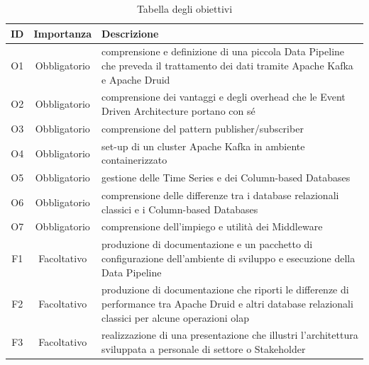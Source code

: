  \begin{table}[htbp]
    \centering
    \caption{Tabella degli obiettivi}    
    \label{tab:Tabella1}
    \begin{tabularx}{\textwidth}{|c|c|X|}
        \hline
        \textbf{ID} & \textbf{Importanza} & \textbf{Descrizione} \\\hline
        O1 & Obbligatorio & comprensione e definizione di una piccola \gls{Data Pipeline}{}  che  preveda il trattamento dei dati
        tramite Apache Kafka e Apache Druid \\\hline
        O2 & Obbligatorio & comprensione dei vantaggi e degli overhead  che le Event Driven Architecture portano con
        sé\\\hline
        O3 & Obbligatorio & comprensione del pattern publisher/subscriber \\\hline
        O4 & Obbligatorio & set-up di un cluster Apache Kafka in ambiente  containerizzato \\\hline
        O5 & Obbligatorio & gestione delle Time Series e dei Column-based Databases \\\hline
        O6 & Obbligatorio & comprensione delle differenze tra i database relazionali  classici e i Column-based Databases\\\hline
        O7 & Obbligatorio &comprensione dell’impiego e utilità dei \gls{Middleware}{} \\\hline
        F1 & Facoltativo & produzione di documentazione e un pacchetto di configurazione  dell’ambiente di sviluppo e
        esecuzione  della \gls{Data Pipeline}{}\\\hline
        F2 & Facoltativo & produzione di documentazione che riporti  le differenze  di performance  tra Apache Druid e altri
         database relazionali classici per alcune  operazioni \gls{olap}{} \\\hline
        F3 & Facoltativo & realizzazione di una presentazione che illustri l’architettura  sviluppata  a personale di settore o
        Stakeholder \\\hline
    \end{tabularx} 

\end{table}
\pagebreak
\pagebreak
